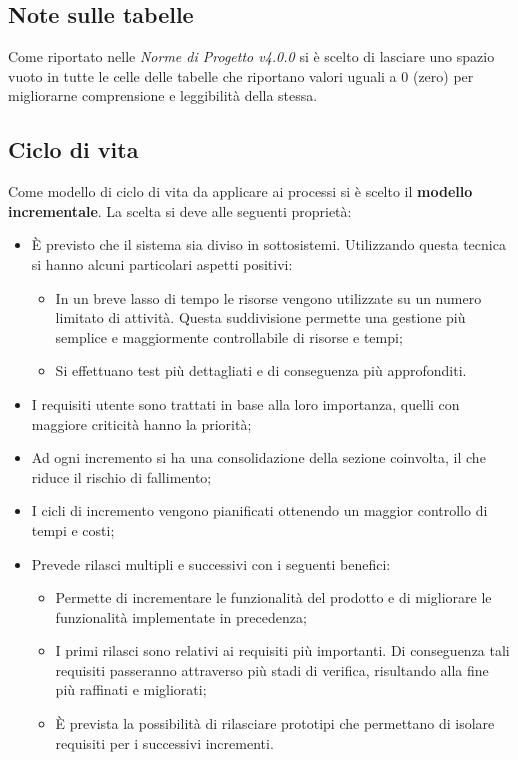 \subsection{Note sulle tabelle}
Come riportato nelle \textit{Norme di Progetto v4.0.0} si è scelto di lasciare uno spazio vuoto in tutte le celle delle tabelle che riportano valori uguali a 0 (zero) per migliorarne comprensione e leggibilità della stessa.

\subsection{Ciclo di vita}
Come modello di ciclo di vita da applicare ai processi si è scelto il \textbf{modello incrementale}. La scelta si deve alle seguenti proprietà:
\begin{itemize}
	\item È previsto che il sistema sia diviso in sottosistemi. Utilizzando questa tecnica si hanno alcuni particolari aspetti positivi:
	\begin{itemize}
		\item In un breve lasso di tempo le risorse vengono utilizzate su un numero limitato di attività. Questa suddivisione permette una gestione più semplice e maggiormente controllabile di risorse e tempi;
		\item Si effettuano test più dettagliati e di conseguenza più approfonditi.
	\end{itemize}
	\item I requisiti utente sono trattati in base alla loro importanza, quelli con maggiore criticità hanno la priorità;
	\item Ad ogni incremento si ha una consolidazione della sezione coinvolta, il che riduce il rischio di fallimento;
	\item I cicli di incremento vengono pianificati ottenendo un maggior controllo di tempi e costi;
	\item Prevede rilasci multipli e successivi con i seguenti benefici:
	\begin{itemize}
		\item Permette di incrementare le funzionalità del prodotto e di migliorare le funzionalità implementate in precedenza;
		\item I primi rilasci sono relativi ai requisiti più importanti. Di conseguenza tali requisiti passeranno attraverso più stadi di verifica, risultando alla fine più raffinati e migliorati;
		\item È prevista la possibilità di rilasciare prototipi che permettano di isolare requisiti per i successivi incrementi.
	\end{itemize}
\end{itemize}
